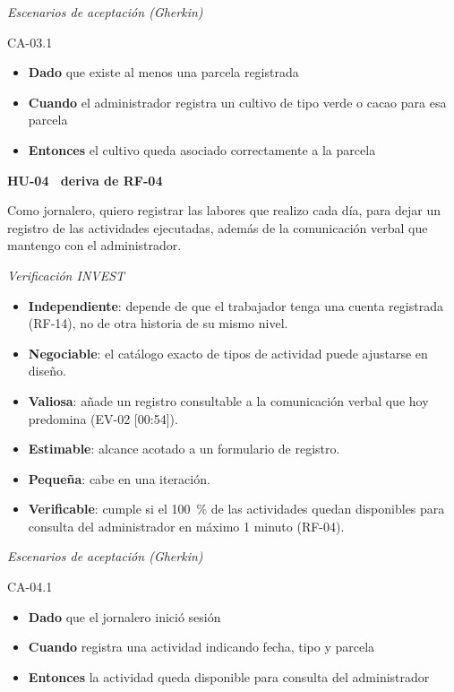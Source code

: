 \documentclass[12pt,a4paper]{article}
\begin{document}
\smallskip
\noindent\textit{Escenarios de aceptación (Gherkin)}

\noindent CA-03.1
\begin{itemize}
\item[] \textbf{Dado} que existe al menos una parcela registrada
\item[] \textbf{Cuando} el administrador registra un cultivo de tipo verde o cacao para esa parcela
\item[] \textbf{Entonces} el cultivo queda asociado correctamente a la parcela
\end{itemize}

\bigskip
\noindent\textbf{HU-04 \textperiodcentered\ deriva de RF-04}

\smallskip
\noindent Como jornalero, quiero registrar las labores que realizo cada día, para dejar un registro de las actividades ejecutadas, además de la comunicación verbal que mantengo con el administrador.

\smallskip
\noindent\textit{Verificación INVEST}
\begin{itemize}
\item \textbf{Independiente}: depende de que el trabajador tenga una cuenta registrada (RF-14), no de otra historia de su mismo nivel.
\item \textbf{Negociable}: el catálogo exacto de tipos de actividad puede ajustarse en diseño.
\item \textbf{Valiosa}: añade un registro consultable a la comunicación verbal que hoy predomina (EV-02 [00:54]).
\item \textbf{Estimable}: alcance acotado a un formulario de registro.
\item \textbf{Pequeña}: cabe en una iteración.
\item \textbf{Verificable}: cumple si el 100~\% de las actividades quedan disponibles para consulta del administrador en máximo 1 minuto (RF-04).
\end{itemize}

\smallskip
\noindent\textit{Escenarios de aceptación (Gherkin)}

\noindent CA-04.1
\begin{itemize}
\item[] \textbf{Dado} que el jornalero inició sesión
\item[] \textbf{Cuando} registra una actividad indicando fecha, tipo y parcela
\item[] \textbf{Entonces} la actividad queda disponible para consulta del administrador
\end{itemize}
\end{document}
